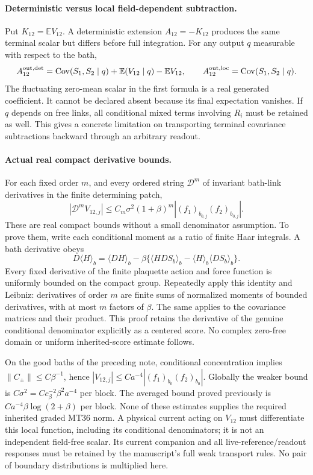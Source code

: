 \documentclass[11pt]{article}
\newcommand{\E}{\mathbb E}
\newcommand{\Cov}{\operatorname{Cov}}
\begin{document}
\paragraph{Deterministic versus local field-dependent subtraction.}
Put $K_{12}=\E V_{12}$. A deterministic extension $A_{12}=-K_{12}$ produces the
same terminal scalar but differs before full integration. For any output $q$ measurable
with respect to the bath,
\[
 A_{12}^{\rm out,det}
 =\Cov(S_1,S_2\mid q)+\E(V_{12}\mid q)-\E V_{12},
 \qquad
 A_{12}^{\rm out,loc}=\Cov(S_1,S_2\mid q).
\]
The fluctuating zero-mean scalar in the first formula is a real generated coefficient.
It cannot be declared absent because its final expectation vanishes. If $q$ depends on
free links, all conditional mixed terms involving $R_i$ must be retained as well.
This gives a concrete limitation on transporting terminal covariance subtractions backward
through an arbitrary readout.

\paragraph{Actual real compact derivative bounds.}
For each fixed order $m$, and every ordered string $\mathcal D^m$ of invariant bath-link
derivatives in the finite determining patch,
\[
 |\mathcal D^m V_{12,j}|\le C_m\sigma^2(1+\beta)^m
 |(f_1)_{b_{0,j}}(f_2)_{b_{0,j}}|.
\]
These are real compact bounds without a small denominator assumption. To prove them,
write each conditional moment as a ratio of finite Haar integrals. A bath derivative obeys
\[
 D\langle H\rangle_b=\langle DH\rangle_b
 -\beta\{\langle H DS_b\rangle_b-\langle H\rangle_b\langle DS_b\rangle_b\}.
\]
Every fixed derivative of the finite plaquette action and force function is uniformly
bounded on the compact group. Repeatedly apply this identity and Leibniz: derivatives
of order $m$ are finite sums of normalized moments of bounded derivatives, with at most
$m$ factors of $\beta$. The same applies to the covariance matrices and their product.
This proof retains the derivative of the genuine conditional denominator explicitly as a
centered score. No complex zero-free domain or uniform inherited-score estimate follows.

On the good baths of the preceding note, conditional concentration implies
$\|C_\pm\|\le C\beta^{-1}$, hence
$|V_{12,j}|\le Ca^{-4}|(f_1)_{b_0}(f_2)_{b_0}|$.
Globally the weaker bound is $C\sigma^2=Cc_\beta^{-2}\beta^2a^{-4}$ per block.
The averaged bound proved previously is $Ca^{-4}\beta\log(2+\beta)$ per block.
None of these estimates supplies the required inherited graded MT36 norm.
A physical current acting on $V_{12}$ must differentiate this local function, including
its conditional denominators; it is not an independent field-free scalar. Its current
companion and all live-reference/readout responses must be retained by the manuscript's
full weak transport rules. No pair of boundary distributions is multiplied here.
\end{document}
